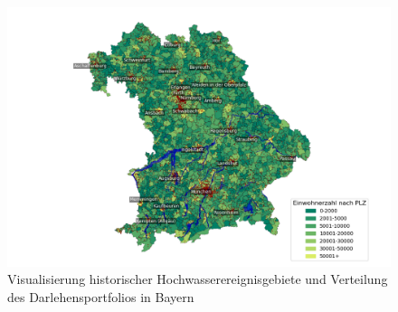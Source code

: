 \begin{figure}[htbp]
    \centering
    \includegraphics[width=\textwidth]{figures/bayern_flut.png} 
    \caption{Visualisierung historischer Hochwasserereignisgebiete und Verteilung des Darlehensportfolios in Bayern}
    \label{fig:bayernflut}
\end{figure}
\FloatBarrier


